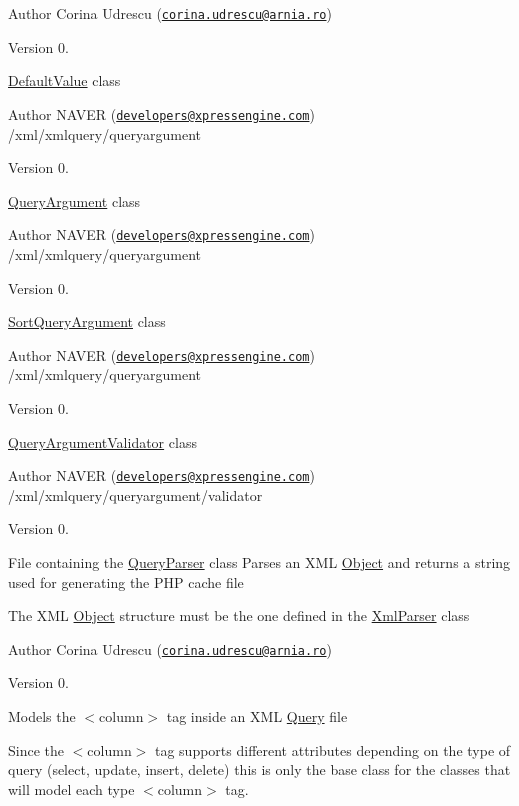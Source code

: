 \begin{DoxyAuthor}{Author}
Corina Udrescu (\href{mailto:corina.udrescu@arnia.ro}{\tt corina.\-udrescu@arnia.\-ro})  
\end{DoxyAuthor}
\begin{DoxyVersion}{Version}
0.
\end{DoxyVersion}
\hyperlink{classDefaultValue}{Default\-Value} class \begin{DoxyAuthor}{Author}
N\-A\-V\-E\-R (\href{mailto:developers@xpressengine.com}{\tt developers@xpressengine.\-com}) /xml/xmlquery/queryargument 
\end{DoxyAuthor}
\begin{DoxyVersion}{Version}
0.
\end{DoxyVersion}
\hyperlink{classQueryArgument}{Query\-Argument} class \begin{DoxyAuthor}{Author}
N\-A\-V\-E\-R (\href{mailto:developers@xpressengine.com}{\tt developers@xpressengine.\-com}) /xml/xmlquery/queryargument 
\end{DoxyAuthor}
\begin{DoxyVersion}{Version}
0.
\end{DoxyVersion}
\hyperlink{classSortQueryArgument}{Sort\-Query\-Argument} class \begin{DoxyAuthor}{Author}
N\-A\-V\-E\-R (\href{mailto:developers@xpressengine.com}{\tt developers@xpressengine.\-com}) /xml/xmlquery/queryargument 
\end{DoxyAuthor}
\begin{DoxyVersion}{Version}
0.
\end{DoxyVersion}
\hyperlink{classQueryArgumentValidator}{Query\-Argument\-Validator} class \begin{DoxyAuthor}{Author}
N\-A\-V\-E\-R (\href{mailto:developers@xpressengine.com}{\tt developers@xpressengine.\-com}) /xml/xmlquery/queryargument/validator 
\end{DoxyAuthor}
\begin{DoxyVersion}{Version}
0.
\end{DoxyVersion}
File containing the \hyperlink{classQueryParser}{Query\-Parser} class Parses an X\-M\-L \hyperlink{classObject}{Object} and returns a string used for generating the P\-H\-P cache file \par
 The X\-M\-L \hyperlink{classObject}{Object} structure must be the one defined in the \hyperlink{classXmlParser}{Xml\-Parser} class

\begin{DoxyAuthor}{Author}
Corina Udrescu (\href{mailto:corina.udrescu@arnia.ro}{\tt corina.\-udrescu@arnia.\-ro})  
\end{DoxyAuthor}
\begin{DoxyVersion}{Version}
0.
\end{DoxyVersion}
Models the $<$column$>$ tag inside an X\-M\-L \hyperlink{classQuery}{Query} file \par
 Since the $<$column$>$ tag supports different attributes depending on the type of query (select, update, insert, delete) this is only the base class for the classes that will model each type $<$column$>$ tag.


